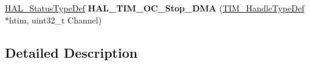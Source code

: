 \begin{DoxyCompactItemize}
\item 
\hypertarget{group___t_i_m___exported___functions___group2_ga27f1f66d2d38ec428580a5feb3628c48}{\hyperlink{stm32l1xx__hal__def_8h_a63c0679d1cb8b8c684fbb0632743478f}{H\-A\-L\-\_\-\-Status\-Type\-Def} {\bfseries H\-A\-L\-\_\-\-T\-I\-M\-\_\-\-O\-C\-\_\-\-Stop\-\_\-\-D\-M\-A} (\hyperlink{struct_t_i_m___handle_type_def}{T\-I\-M\-\_\-\-Handle\-Type\-Def} $\ast$htim, uint32\-\_\-t Channel)}\label{group___t_i_m___exported___functions___group2_ga27f1f66d2d38ec428580a5feb3628c48}

\end{DoxyCompactItemize}


\subsection{Detailed Description}
